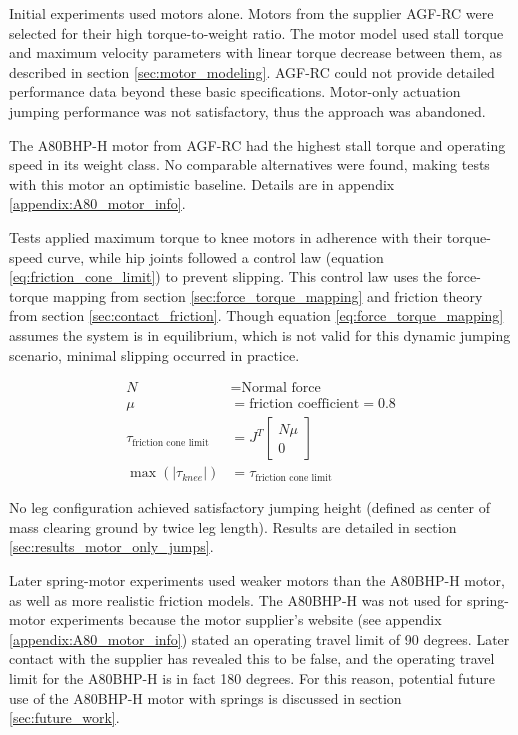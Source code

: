 Initial experiments used motors alone. Motors from the supplier AGF-RC were selected for their high torque-to-weight ratio. The motor model used stall torque and maximum velocity parameters with linear torque decrease between them, as described in section \ref{sec:motor_modeling}. AGF-RC could not provide detailed performance data beyond these basic specifications. Motor-only actuation jumping performance was not satisfactory, thus the approach was abandoned. 

The A80BHP-H motor from AGF-RC had the highest stall torque and operating speed in its weight class. No comparable alternatives were found, making tests with this motor an optimistic baseline. Details are in appendix \ref{appendix:A80_motor_info}.

Tests applied maximum torque to knee motors in adherence with their torque-speed curve, while hip joints followed a control law (equation \ref{eq:friction_cone_limit}) to prevent slipping. This control law uses the force-torque mapping from section \ref{sec:force_torque_mapping} and friction theory from section \ref{sec:contact_friction}. Though equation \ref{eq:force_torque_mapping} assumes the system is in equilibrium, which is not valid for this dynamic jumping scenario, minimal slipping occurred in practice.

\begin{align}
    N &= \text{Normal force} \\
    \mu &= \text{friction coefficient} = 0.8 \\
    \tau_{\text{friction cone limit}} &= J^T 
    \begin{bmatrix}
        N \mu \\
        0
    \end{bmatrix} \\
    \max(|\tau_{knee}|) &= \tau_{\text{friction cone limit}}
    \label{eq:friction_cone_limit}
\end{align}

No leg configuration achieved satisfactory jumping height (defined as center of mass clearing ground by twice leg length). Results are detailed in section \ref{sec:results_motor_only_jumps}.

Later spring-motor experiments used weaker motors than the A80BHP-H motor, as well as more realistic friction models. The A80BHP-H was not used for spring-motor experiments because the motor supplier's website (see appendix \ref{appendix:A80_motor_info}) stated an operating travel limit of 90 degrees. Later contact with the supplier has revealed this to be false, and the operating travel limit for the A80BHP-H is in fact 180 degrees. For this reason, potential future use of the A80BHP-H motor with springs is discussed in section \ref{sec:future_work}.


